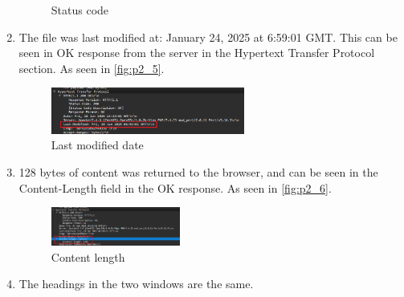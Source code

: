 \documentclass{article}
\begin{document}
\begin{enumerate}
\begin{figure}[ht!]
        \caption{Status code}
        \label{fig:p2_4}
    \end{figure}
    \item The file was last modified at: January 24, 2025 at 6:59:01 GMT. This can be seen in OK response from the server in the Hypertext Transfer Protocol section. As seen in \autoref{fig:p2_5}.
    \begin{figure}[ht!]
        \centering
        \includegraphics[width=0.6\textwidth]{p2_5}
        \caption{Last modified date}
        \label{fig:p2_5}
    \end{figure}
    \item 128 bytes of content was returned to the browser, and can be seen in the Content-Length field in the OK response. As seen in \autoref{fig:p2_6}.
    \begin{figure}[ht!]
        \centering
        \includegraphics[width=0.4\textwidth]{p2_6}
        \caption{Content length}
        \label{fig:p2_6}
    \end{figure}

    \item The headings in the two windows are the same.
\end{enumerate}
\end{document}
